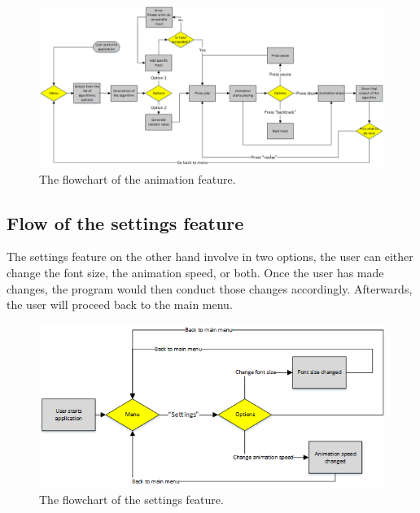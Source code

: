 \begin{landscape}
\begin{figure}[H]
\centering
\hspace*{-1cm}
\includegraphics[scale=0.8]{images/report_images/flowchartAnimation.png}
\caption{The flowchart of the animation feature.}
\label{flowchartAnimation}
\end{figure}
\end{landscape}

\newpage

\subsection{Flow of the settings feature} \label{sec:flowchartSettings}
The settings feature on the other hand involve in two options, the user can either change the font size, the animation speed, or both. Once the user has made changes, the program would then conduct those changes accordingly. Afterwards, the user will proceed back to the main menu.

\begin{figure}[H]
\centering
\hspace*{-2cm}
\includegraphics[scale=0.9]{images/report_images/flowchartSettings.png}
\caption{The flowchart of the settings feature.}
\label{flowchartSettings}
\end{figure}

